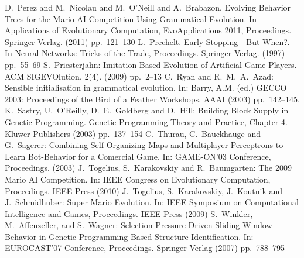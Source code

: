 \documentclass[conference]{IEEEtran}
\begin{document}
\begin{thebibliography}{11}
	D.~Perez and M.~Nicolau and M.~O'Neill and A.~Brabazon.
	Evolving Behavior Trees for the Mario AI Competition Using Grammatical Evolution.
	In Applications of Evolutionary Computation, EvoApplications 2011, Proceedings.
	Springer Verlag. (2011)
	pp.~121--130
	L.~Prechelt.
	Early Stopping - But When?.
	In Neural Networks: Tricks of the Trade, Proceedings.
	Springer Verlag. (1997)
	pp.~55--69
	S.~Priesterjahn:
	Imitation-Based Evolution of Artificial Game Players.
	ACM SIGEVOlution, 2(4). (2009)
	pp.~2--13
	C.~Ryan and R.~M.~A.~Azad:
	Sensible initialisation in grammatical evolution.
	In: Barry, A.M. (ed.) {GECCO 2003}: Proceedings of the Bird of a Feather Workshops.
	AAAI (2003)
	pp.~142--145.
	K.~Sastry, U.~O'Reilly, D.~E.~Goldberg and D.~Hill:
	Building Block Supply in Genetic Programming.
	Genetic Programming Theory and Practice, Chapter 4.
	Kluwer Publishers (2003)
	pp.~137--154
	C.~Thurau, C.~Bauckhauge and G.~Sagerer:
	Combining Self Organizing Maps and Multiplayer Perceptrons to Learn
	Bot-Behavior for a Comercial Game.
	In: GAME-ON'03 Conference, Proceedings. (2003)
	J.~Togelius, S.~Karakovskiy and R.~Baumgarten:
	The 2009 Mario AI Competition.
	In: IEEE Congress on Evolutionary Computation, Proceedings.
	IEEE Press (2010)
	J.~Togelius, S.~Karakovskiy, J.~Koutnik and J.~Schmidhuber:
	Super Mario Evolution.
	In: IEEE Symposium on Computational Intelligence and Games, Proceedings.
	IEEE Press (2009)
	S.~Winkler, M.~Affenzeller, and S.~Wagner:
	Selection Pressure Driven Sliding Window Behavior in Genetic
	Programming Based Structure Identification.
	In: EUROCAST'07 Conference, Proceedings.
	Springer-Verlag (2007)
	pp.~788--795
\end{thebibliography}
\end{document}
